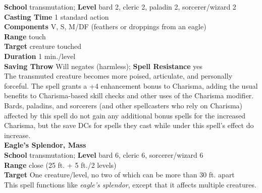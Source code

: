\textbf{School} transmutation; \textbf{Level} bard 2, cleric 2, paladin 2, sorcerer/wizard 2\\
\textbf{Casting Time} 1 standard action\\
\textbf{Components} V, S, M/DF (feathers or droppings from an eagle)\\
\textbf{Range} touch\\
\textbf{Target} creature touched\\
\textbf{Duration} 1 min./level\\
\textbf{Saving Throw }Will negates (harmless); \textbf{Spell Resistance} yes\\
The transmuted creature becomes more poised, articulate, and personally forceful. The spell grants a +4 enhancement bonus to Charisma, adding the usual benefits to Charisma-based skill checks and other uses of the Charisma modifier. Bards, paladins, and sorcerers (and other spellcasters who rely on Charisma) affected by this spell do not gain any additional bonus spells for the increased Charisma, but the save DCs for spells they cast while under this spell's effect do increase.\\
\textbf{Eagle's Splendor, Mass}\\
\textbf{School} transmutation; \textbf{Level} bard 6, cleric 6, sorcerer/wizard 6\\
\textbf{Range} close (25 ft. + 5 ft./2 levels)\\
\textbf{Target} One creature/level, no two of which can be more than 30 ft. apart\\
This spell functions like \textit{eagle's splendor}, except that it affects multiple creatures.\\
